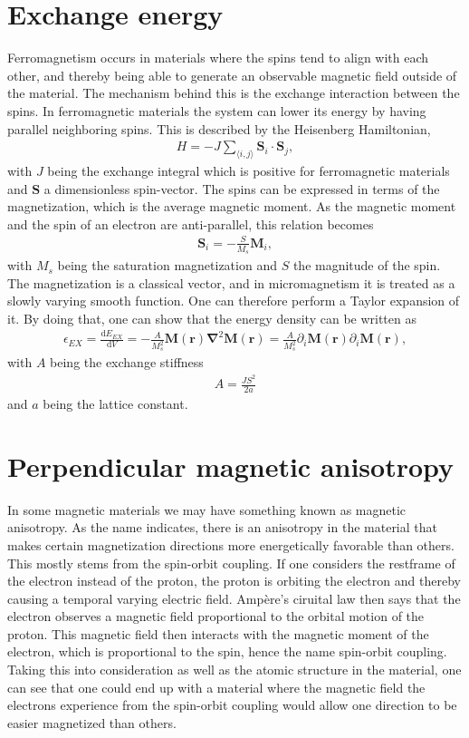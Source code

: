 \documentclass[12pt, a4paper, twoside, openright]{report}
\numberwithin{equation}{chapter}
\numberwithin{figure}{chapter}
\numberwithin{table}{chapter}
\begin{document}
\section{Exchange energy}
Ferromagnetism occurs in materials where the spins tend to align with each other, and thereby being able to generate an observable magnetic field outside of the material. The mechanism behind this is the exchange interaction between the spins. In ferromagnetic materials the system can lower its energy by having parallel neighboring spins. This is described by the Heisenberg Hamiltonian,
\begin{align}
H = - J\sum_{\langle i,j\rangle} \mathbold{S}_i\cdot\mathbold{S}_j,
\end{align}
with $J$ being the exchange integral which is positive for ferromagnetic materials and $\mathbold{S}$ a dimensionless spin-vector. The spins can be expressed in terms of the magnetization, which is the average magnetic moment. As the magnetic moment and the spin of an electron are anti-parallel, this relation becomes
\begin{align}
\mathbold{S}_i = -\frac{S}{M_s}\mathbold{M}_i,
\end{align}
with $M_s$ being the saturation magnetization and $S$ the magnitude of the spin. The magnetization is a classical vector, and in micromagnetism it is treated as a slowly varying smooth function. One can therefore perform a Taylor expansion of it. By doing that, one can show \cite{Project} that the energy density can be written as
\begin{align}
\epsilon_{EX} = \frac{\textrm{d} E_{EX}}{\textrm{d} V} = -\frac{A}{M_s^2}\mathbold{M}(\mathbold{r})\mathbold{\nabla}^2\mathbold{M}(\mathbold{r}) = \frac{A}{M_s^2}\partial_i\mathbold{M}(\mathbold{r})\partial_i\mathbold{M}(\mathbold{r}), \label{eq:exchDensity}
\end{align}
with $A$ being the exchange stiffness
\begin{align}
A = \frac{J S^2}{2a}
\end{align}
and $a$ being the lattice constant.
\section{Perpendicular magnetic anisotropy}
In some magnetic materials we may have something known as magnetic anisotropy. As the name indicates, there is an anisotropy in the material that makes certain magnetization directions more energetically favorable than others. This mostly stems from the spin-orbit coupling. If one considers the restframe of the electron instead of the proton, the proton is orbiting the electron and thereby causing a temporal varying electric field. Amp\`{e}re's ciruital law then says that the electron observes a magnetic field proportional to the orbital motion of the proton. This magnetic field then interacts with the magnetic moment of the electron, which is proportional to the spin, hence the name spin-orbit coupling. Taking this into consideration as well as the atomic structure in the material, one can see that one could end up with a material where the magnetic field the electrons experience from the spin-orbit coupling would allow one direction to be easier magnetized than others.
\end{document}
